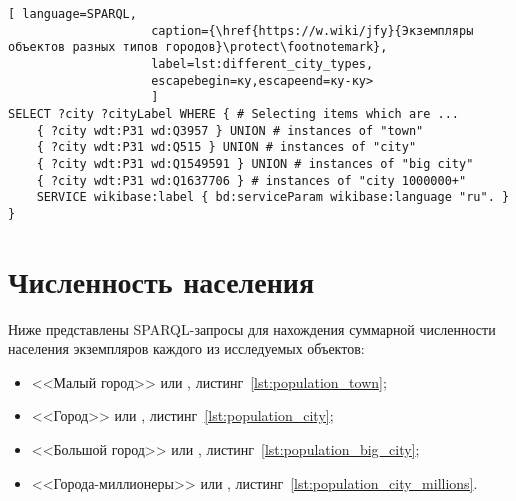 \begin{lstlisting}[ language=SPARQL, 
                    caption={\href{https://w.wiki/jfy}{Экземпляры объектов разных типов городов}\protect\footnotemark},
                    label=lst:different_city_types, 
                    escapebegin=ку,escapeend=ку-ку>
                    ]
SELECT ?city ?cityLabel WHERE { # Selecting items which are ...
	{ ?city wdt:P31 wd:Q3957 } UNION # instances of "town"
	{ ?city wdt:P31 wd:Q515 } UNION # instances of "city"
	{ ?city wdt:P31 wd:Q1549591 } UNION # instances of "big city"
	{ ?city wdt:P31 wd:Q1637706 } # instances of "city 1000000+"                                
	SERVICE wikibase:label { bd:serviceParam wikibase:language "ru". }
}
\end{lstlisting}


\section{Численность населения}

Ниже представлены SPARQL-запросы для нахождения суммарной численности населения экземпляров каждого из исследуемых объектов: 
\begin{itemize}
	\item <<Малый город>> или , листинг~\ref{lst:population_town};
	\item <<Город>> или , листинг~\ref{lst:population_city};
	\item <<Большой город>> или , листинг~\ref{lst:population_big_city};
	\item <<Города-миллионеры>> или , листинг~\ref{lst:population_city_millions}.
\end{itemize}


